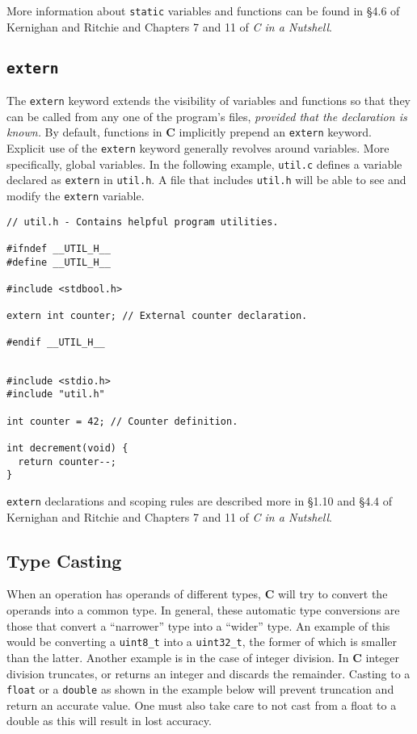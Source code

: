 \documentclass[11pt]{article}
\begin{document}
More information about \texttt{static} variables and functions can be found in
\S 4.6 of Kernighan and Ritchie and Chapters 7 and 11 of \emph{C in a Nutshell}.

\subsection{\texttt{extern}}
The \texttt{extern} keyword extends the visibility of variables and
functions so that they can be called from any one of the program's files,
\emph{provided that the declaration is known.} By default, functions in
\textbf{C} implicitly prepend an \texttt{extern} keyword. Explicit use of the
\texttt{extern} keyword generally revolves around variables. More specifically,
global variables. In the following example, \texttt{util.c} defines a variable
declared as \texttt{extern} in \texttt{util.h}. A file that includes
\texttt{util.h} will be able to see and modify the \texttt{extern} variable.
\begin{lstlisting}[title=util.h]
// util.h - Contains helpful program utilities.

#ifndef __UTIL_H__
#define __UTIL_H__

#include <stdbool.h>

extern int counter; // External counter declaration.

#endif __UTIL_H__
\end{lstlisting}

\begin{lstlisting}[title=util.c]

#include <stdio.h>
#include "util.h"

int counter = 42; // Counter definition.

int decrement(void) {
  return counter--;
}
\end{lstlisting}

\texttt{extern} declarations and scoping rules are described more in \S 1.10 and \S 4.4
of Kernighan and Ritchie and Chapters 7 and 11 of \emph{C in a Nutshell}.

\subsection{Type Casting}
When an operation has operands of different types, \textbf{C} will try to
convert the operands into a common type. In
general, these automatic type conversions are those that convert a ``narrower''
type into a ``wider'' type. An example of this would be converting a
\texttt{uint8\_t} into a \texttt{uint32\_t}, the former of which is smaller than
the latter. Another example is in the case of integer division. In \textbf{C}
integer division truncates, or returns an integer and discards the remainder.
Casting to a \texttt{float} or a \texttt{double} as shown in the example below
will prevent truncation and return an accurate value. One must also take care
to not cast from a float to a double as this will result in lost accuracy.
\end{document}

